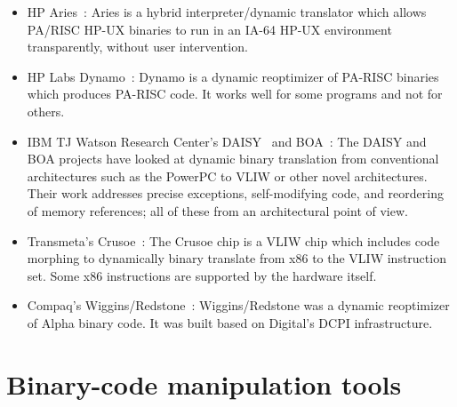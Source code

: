 \begin{itemize}
\item HP Aries~\cite{Zhen00}: 
Aries is a hybrid interpreter/dynamic translator which
allows PA/RISC HP-UX binaries to run in an IA-64 HP-UX
environment transparently, without user intervention.

\item HP Labs Dynamo~\cite{Bala00}: 
Dynamo is a dynamic reoptimizer of PA-RISC binaries which
produces PA-RISC code.  It works well for some programs 
and not for others. 

\item IBM TJ Watson Research Center's DAISY~\cite{Ebci96} and 
BOA~\cite{Gsch00}: 
The DAISY and BOA projects have looked at dynamic binary translation 
from conventional architectures such as the PowerPC to VLIW or other
novel architectures.  Their work addresses precise exceptions, 
self-modifying code, and reordering of memory references; all of 
these from an architectural point of view. 

\item Transmeta's Crusoe~\cite{Gepp00}: 
The Crusoe chip is a VLIW chip which includes code morphing to 
dynamically binary translate from x86 to the VLIW instruction set. 
Some x86 instructions are supported by the hardware itself. 

\item Compaq's Wiggins/Redstone~\cite{Reev00}: 
Wiggins/Redstone was a dynamic reoptimizer of Alpha binary code. 
It was built based on Digital's DCPI infrastructure.  

\end{itemize}



\section{Binary-code manipulation tools}

